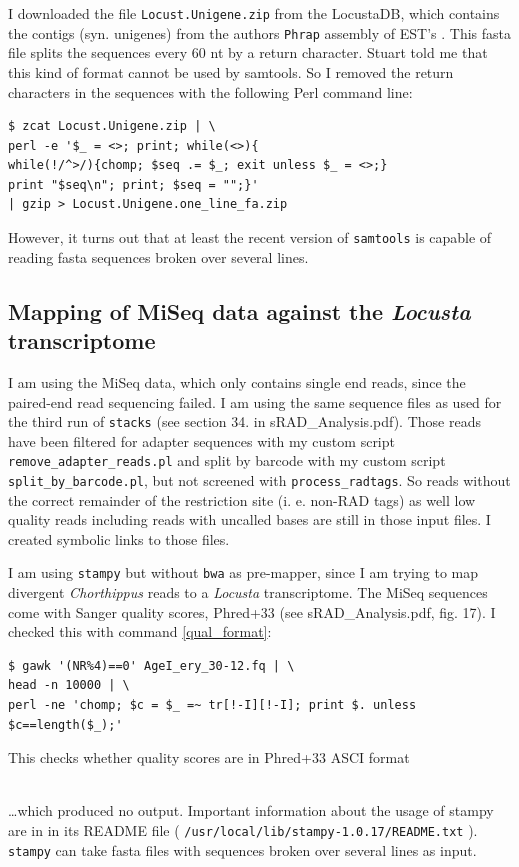 \documentclass{article}\usepackage[]{graphicx}\usepackage[]{color}
\begin{document}
I downloaded the file \texttt{Locust.Unigene.zip} from the LocustaDB, which contains the contigs (syn. unigenes) from the authors \texttt{Phrap} assembly of EST's \citep{Ma2006, Kang2004}. This fasta file splits the sequences every 60 nt by a return character.
Stuart told me that this kind of format cannot be used by samtools. So I removed the return characters in the sequences with the following Perl command line:

\begin{Verbatim}
$ zcat Locust.Unigene.zip | \
perl -e '$_ = <>; print; while(<>){
while(!/^>/){chomp; $seq .= $_; exit unless $_ = <>;} 
print "$seq\n"; print; $seq = "";}' 
| gzip > Locust.Unigene.one_line_fa.zip
\end{Verbatim}

However, it turns out that at least the recent version of \texttt{samtools} is capable of reading fasta sequences broken over several lines.

\subsection{Mapping of MiSeq data against the \textit{Locusta} transcriptome}

I am using the MiSeq data, which only contains single end reads, since the paired-end read sequencing failed. I am using the same sequence files as used for the third run of \texttt{stacks} (see section 34. in sRAD\_Analysis.pdf). Those reads have been filtered for adapter sequences with my custom script \texttt{remove\_adapter\_reads.pl} and split by barcode with my custom script \texttt{split\_by\_barcode.pl}, but not screened with \texttt{process\_radtags}. So reads without the correct remainder of the restriction site (i. e. non-RAD tags) as well low quality reads including reads with uncalled bases are still in those input files. I created symbolic links to those files.

I am using \texttt{stampy} but without \texttt{bwa} as pre-mapper, since I am trying to map divergent \textit{Chorthippus} reads to a \textit{Locusta} transcriptome. The MiSeq sequences come with Sanger quality scores, Phred+33 (see sRAD\_Analysis.pdf, fig. 17). I checked this with command \ref{qual_format}:
\begin{command}
\captionsetup{type=command} %
\begin{Verbatim}
$ gawk '(NR%4)==0' AgeI_ery_30-12.fq | \
head -n 10000 | \
perl -ne 'chomp; $c = $_ =~ tr[!-I][!-I]; print $. unless $c==length($_);'
\end{Verbatim}
\caption{This checks whether quality scores are in Phred+33 ASCI format}
\label{qual_format}
\end{command}
\\
\ldots which produced no output. Important information about the usage of stampy are in in its README file ( \texttt{/usr/local/lib/stampy-1.0.17/README.txt} ). \texttt{stampy} can take fasta files with sequences broken over several lines as input. 
\end{document}
